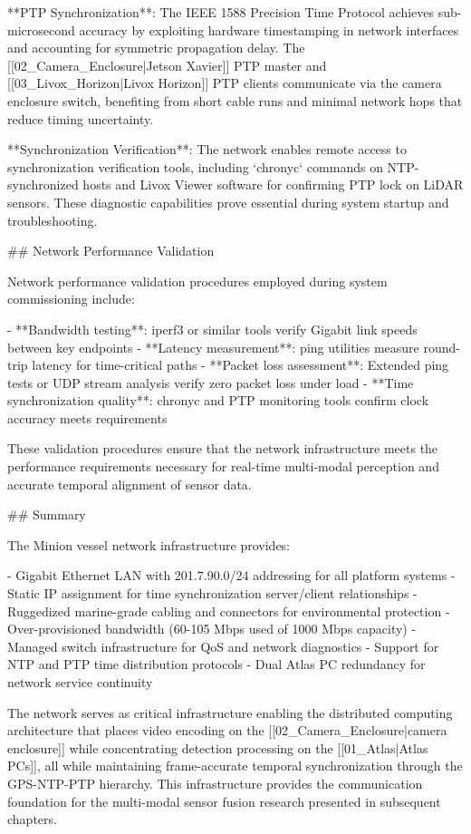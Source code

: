\documentclass{erauthesis}
\begin{document}
**PTP Synchronization**: The IEEE 1588 Precision Time Protocol achieves sub-microsecond accuracy by exploiting hardware timestamping in network interfaces and accounting for symmetric propagation delay. The [[02_Camera_Enclosure|Jetson Xavier]] PTP master and [[03_Livox_Horizon|Livox Horizon]] PTP clients communicate via the camera enclosure switch, benefiting from short cable runs and minimal network hops that reduce timing uncertainty.

**Synchronization Verification**: The network enables remote access to synchronization verification tools, including `chronyc` commands on NTP-synchronized hosts and Livox Viewer software for confirming PTP lock on LiDAR sensors. These diagnostic capabilities prove essential during system startup and troubleshooting.

## Network Performance Validation

Network performance validation procedures employed during system commissioning include:

- **Bandwidth testing**: iperf3 or similar tools verify Gigabit link speeds between key endpoints
- **Latency measurement**: ping utilities measure round-trip latency for time-critical paths
- **Packet loss assessment**: Extended ping tests or UDP stream analysis verify zero packet loss under load
- **Time synchronization quality**: chronyc and PTP monitoring tools confirm clock accuracy meets requirements

These validation procedures ensure that the network infrastructure meets the performance requirements necessary for real-time multi-modal perception and accurate temporal alignment of sensor data.

## Summary

The Minion vessel network infrastructure provides:

- Gigabit Ethernet LAN with 201.7.90.0/24 addressing for all platform systems
- Static IP assignment for time synchronization server/client relationships
- Ruggedized marine-grade cabling and connectors for environmental protection
- Over-provisioned bandwidth (60-105 Mbps used of 1000 Mbps capacity)
- Managed switch infrastructure for QoS and network diagnostics
- Support for NTP and PTP time distribution protocols
- Dual Atlas PC redundancy for network service continuity

The network serves as critical infrastructure enabling the distributed computing architecture that places video encoding on the [[02_Camera_Enclosure|camera enclosure]] while concentrating detection processing on the [[01_Atlas|Atlas PCs]], all while maintaining frame-accurate temporal synchronization through the GPS-NTP-PTP hierarchy. This infrastructure provides the communication foundation for the multi-modal sensor fusion research presented in subsequent chapters.
\end{document}
